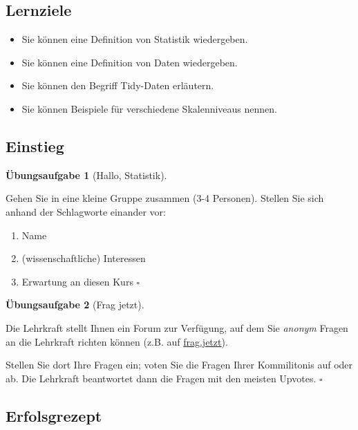\documentclass[
  a4paper,
  DIV=11]{scrreprt}
\providecommand{\tightlist}{%
  \setlength{\itemsep}{0pt}\setlength{\parskip}{0pt}}\usepackage{longtable,booktabs,array}
\theoremstyle{definition}
\newtheorem{exercise}{Übungsaufgabe}[chapter]
\theoremstyle{definition}
\theoremstyle{definition}
\theoremstyle{remark}
\begin{document}
\subsection{Lernziele}\label{lernziele-1}

\begin{itemize}
\tightlist
\item
  Sie können eine Definition von Statistik wiedergeben.
\item
  Sie können eine Definition von Daten wiedergeben.
\item
  Sie können den Begriff Tidy-Daten erläutern.
\item
  Sie können Beispiele für verschiedene Skalenniveaus nennen.
\end{itemize}

\subsection{Einstieg}\label{einstieg}

\begin{exercise}[Hallo,
Statistik]\protect\hypertarget{exr-einstieg}{}\label{exr-einstieg}

Gehen Sie in eine kleine Gruppe zusammen (3-4 Personen). Stellen Sie
sich anhand der Schlagworte einander vor:

\begin{enumerate}
\def\labelenumi{\arabic{enumi}.}
\tightlist
\item
  Name
\item
  (wissenschaftliche) Interessen
\item
  Erwartung an diesen Kurs \(\square\)
\end{enumerate}

\end{exercise}

\begin{exercise}[Frag
jetzt]\protect\hypertarget{exr-fragjetzt}{}\label{exr-fragjetzt}

Die Lehrkraft stellt Ihnen ein Forum zur Verfügung, auf dem Sie
\emph{anonym} Fragen an die Lehrkraft richten können (z.B. auf
\href{https://frag.jetzt/home}{frag.jetzt}).

Stellen Sie dort Ihre Fragen ein; voten Sie die Fragen Ihrer
Kommilitonis auf oder ab. Die Lehrkraft beantwortet dann die Fragen mit
den meisten Upvotes. \(\square\)

\end{exercise}

\subsection{Erfolsgrezept}\label{erfolsgrezept}
\end{document}
